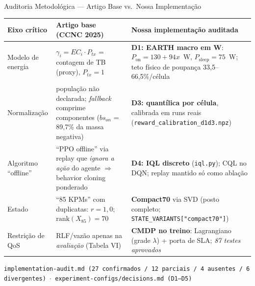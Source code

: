 \documentclass[aspectratio=169,10pt,xcolor={dvipsnames,table}]{beamer}
\newcommand{\datapath}[1]{{\scriptsize\color{darkgray}\texttt{#1}}}
\begin{document}
\begin{frame}{Auditoria Metodol\'ogica --- Artigo Base vs.\ Nossa Implementa\c{c}\~ao}
  \begin{table}
    \centering\scriptsize
    \setlength{\tabcolsep}{4pt}
    \renewcommand{\arraystretch}{1.08}
    \begin{tabular}{@{}p{2.0cm}p{4.35cm}p{5.0cm}@{}}
      \toprule
      \textbf{Eixo crítico} & \textbf{Artigo base (CCNC 2025)} & \textbf{Nossa implementação auditada} \\
      \midrule
      Modelo de energia &
        $\gamma_i = EC_i\cdot P_{tx}$ = contagem de TB (proxy), $P_{tx}{=}1$ &
        \textbf{D1: EARTH macro em W}: $P_{\text{on}} = 130 + 94x$~W,
        $P_{\text{sleep}} = 75$~W; teto físico de poupança 33,5--66,5\%/célula \\
      \addlinespace[2pt]
      Normalização &
        população não declarada; \emph{fallback} comprime componentes
        ($bs_{on}$ = 89,7\% da massa negativa) &
        \textbf{D3: quantílica por célula}, calibrada em runs reais
        (\texttt{reward\_calibration\_d1d3.npz}) \\
      \addlinespace[2pt]
      Algoritmo ``offline'' &
        ``PPO offline'' via replay que \emph{ignora a ação} do agente
        $\Rightarrow$ behavior cloning ponderado &
        \textbf{D4: IQL discreto} (\texttt{iql.py}); CQL no DQN;
        replay mantido só como ablação \\
      \addlinespace[2pt]
      Estado &
        ``85 KPMs'' com duplicatas: $r{=}1{,}0$; $\text{rank}(X_{85})=70$ &
        \textbf{Compact70} via SVD (posto completo;
        \texttt{STATE\_VARIANTS["compact70"]}) \\
      \addlinespace[2pt]
      Restrição de QoS &
        RLF/vazão apenas na \emph{avaliação} (Tabela VI) &
        \textbf{CMDP no treino}: Lagrangiano (grade $\lambda$) + porta de SLA;
        \emph{87 testes aprovados} \\
      \bottomrule
    \end{tabular}
  \end{table}
  \vspace{-2mm}
  \datapath{implementation-audit.md (27 confirmados / 12 parciais / 4 ausentes / 6 divergentes) $\cdot$ experiment-configs/decisions.md (D1--D5)}
\end{frame}
\end{document}
